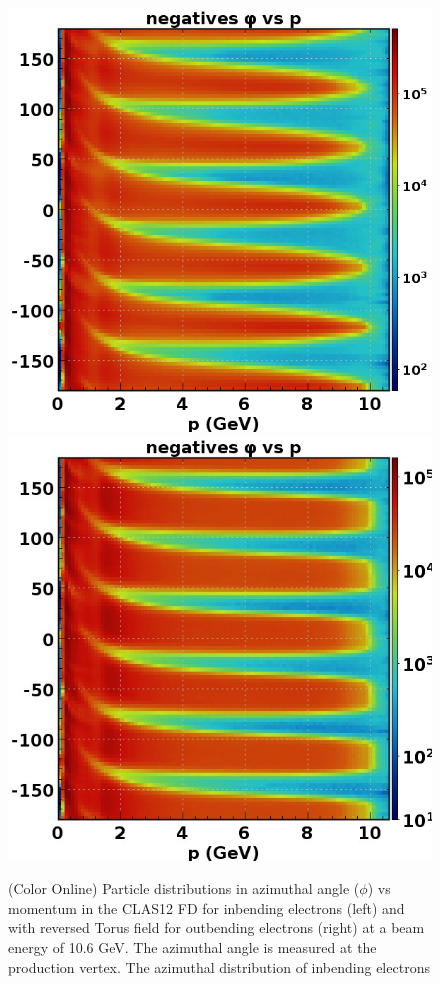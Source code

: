 \documentclass[final,3p,twocolumn]{elsarticle}
\begin{document}
\begin{figure}[h!]
\vspace{0.5cm}%
\centerline{\includegraphics[width=0.85\columnwidth]{neg_phi_p.png}
\hspace{1cm}\includegraphics[width=0.85\columnwidth]{neg_phi_p-out.jpg}}
\caption{(Color Online) Particle distributions in azimuthal angle ($\phi$) vs momentum in the CLAS12 FD for inbending electrons  (left) and with reversed Torus field for outbending electrons (right) at a beam energy of 10.6 GeV.  The azimuthal angle is measured at the production vertex. The azimuthal distribution of inbending electrons 
}
\end{figure}
\end{document}
